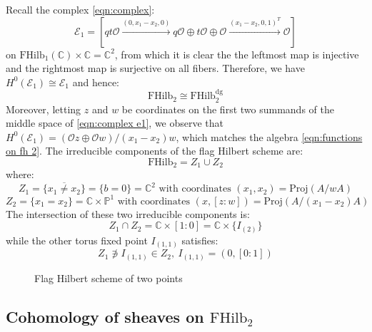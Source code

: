 \documentclass[12pt]{amsart}
\numberwithin{equation}{section}
\theoremstyle{definition}
\theoremstyle{remark}
\newcommand{\CC}{\mathbb{C}}
\newcommand{\PP}{\mathbb{P}}
\newcommand{\CE}{\mathcal{E}}
\newcommand{\CO}{\mathcal{O}}
\newcommand{\CT}{\mathcal{T}}
\renewcommand{\1}{\mathbf{1}}
\newcommand{\FH}{\mathrm{FHilb}}
\newcommand{\proj}{\mathrm{Proj}}
\newcommand{\dg}{\text{dg}}%
\begin{document}
Recall the complex \eqref{eqn:complex}:
\begin{equation}
\label{eqn:complex e1}
\CE_1 = \left[qt \CO \xrightarrow{(0,x_1-x_2,0)} q \CO \oplus t \CO \oplus \CO \xrightarrow{(x_1-x_2,0,1)^T} \CO \right]
\end{equation}
on $\FH_1(\CC) \times \CC = \CC^2$, from which it is clear the the leftmost map is injective and the rightmost map is surjective on all fibers. Therefore, we have $H^0(\CE_1) \cong \CE_1$ and hence:
$$
\FH_2 \cong \FH_2^{\dg}
$$ 
Moreover, letting $z$ and $w$ be coordinates on the first two summands of the middle space of \eqref{eqn:complex e1}, we observe that $H^0(\CE_1) = (\CO  z \oplus \CO w)/(x_1-x_2)w$, which matches the algebra \eqref{eqn:functions on fh 2}. The irreducible components of the flag Hilbert scheme are:
\begin{equation}
\label{eqn:irreducible components n=2}
\FH_2 = Z_1 \cup Z_2
\end{equation}
where:
\begin{equation}
\label{eqn:z1 n=2}
Z_1 = \overline{\{x_1\neq x_2\}} = \{b=0\} = \CC^2 \text{ with coordinates } (x_1,x_2) = \proj(A/wA)
\end{equation}
\begin{equation}
\label{eqn:z2 n=2}
Z_2 = \{x_1=x_2\} = \CC \times \PP^1 \text{ with coordinates } (x,[z:w]) = \proj(A/(x_1-x_2)A)
\end{equation}
The intersection of these two irreducible components is:
$$
Z_1 \cap Z_2 = \CC \times [1:0] = \CC \times \{ I_{(2)} \}
$$
while the other torus fixed point $I_{(1,1)}$ satisfies:
$$
Z_1 \not \ni I_{(1,1)} \in Z_2, \ I_{(1,1)} = (0,[0:1])
$$

\begin{figure}[ht!]
\caption{Flag Hilbert scheme of two points}
\label{fig:fh2}
\end{figure}

\subsection{Cohomology of sheaves on $\FH_2$}
\label{sub:coh 2}
\end{document}
